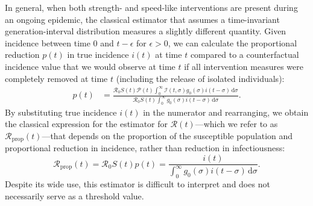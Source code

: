 \documentclass[12pt]{article}
\newcommand{\Rx}[1]{\ensuremath{{\mathcal R}_{#1}}\xspace}
\newcommand{\Ro}{\Rx{0}}
\newcommand{\RR}{\ensuremath{{\mathcal R}}\xspace}
\newcommand{\Rprop}{\Rx{\mathrm{prop}}}
\newcommand{\dd}[1]{\ensuremath{\, \mathrm{d}#1}}
\newcommand{\dsigma}{\dd{\sigma}}
\newcommand{\PP}{{\mathcal P}}
\newcommand{\II}{{\mathcal I}}
\begin{document}
In general, when both strength- and speed-like interventions are present during an ongoing epidemic, the classical estimator that assumes a time-invariant generation-interval distribution measures a slightly different quantity.
Given incidence between time $0$ and $t-\epsilon$ for $\epsilon > 0$, we can calculate the proportional reduction $p(t)$ in true incidence $i(t)$ at time $t$ compared to a counterfactual incidence value that we would observe at time $t$ if all intervention measures were completely removed at time $t$ (including the release of isolated individuals):
\begin{align}
p(t) &= \frac{\Ro S(t) \PP(t) \int_0^\infty \II(t, \sigma) g_0(\sigma) i(t-\sigma)\dsigma}{\Ro S(t) \int_0^\infty g_0(\sigma) i(t-\sigma) \dsigma}.
\end{align}
By substituting true incidence $i(t)$ in the numerator and rearranging, we obtain the classical expression for the estimator for $\RR(t)$---which we refer to as $\Rprop(t)$---that depends on the proportion of the susceptible population and proportional reduction in incidence, rather than reduction in infectiousness:
\begin{equation}
\Rprop(t) = \Ro S(t) p(t) = \frac{i(t)}{\int_0^\infty g_0(\sigma) i(t-\sigma) \dsigma}.
\end{equation}
Despite its wide use, this estimator is difficult to interpret and does not necessarily serve as a threshold value.
\end{document}
